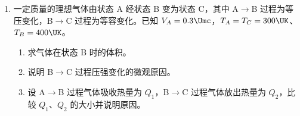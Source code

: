 \documentclass[\gkver]{gaokaozhenti}
\begin{document}
\begin{enumerate}
{（2）$\frac{t_{0}}{2}$ 时刻进入两极板的带电粒子，前 $\frac{t_{0}}{2}$ 时间在电场中偏转，后 $\frac{t_{0}}{2}$ 时间两极板没有电场，带电粒子做匀速直线运动。带电粒子沿 $x$ 轴方向的分速度大小为 $v_{0}=\frac{l}{t_{0}}$ ⑤，带电粒子离开电场时沿 $y$ 轴负方向的分速度大小为 $v_{y}=a\cdot\frac{1}{2}t_{0}$ ⑥，带电粒子离开电场时的速度大小为 $v=\sqrt{v_{x}^{2}+v_{y}^{2}}$ ⑦。设带电粒子离开电场进入磁场做匀速圆周运动的半径为 $R$，则有 $Bqv=m\frac{v^{2}}{R}$ ⑧，联立③⑤⑥⑦⑧式解得 $R=\frac{\sqrt{5}ml}{2qBt_{0}}$ ⑨。

（3）$2t_{0}$ 时刻进入两极板的带电粒子在磁场中运动时间最短。带电粒子离开电场时沿 $y$ 轴正方向的分速度为 $v_{y}'=at_{0}$ ⑩，设带电粒子离开电场时速度方向与 $y$ 轴正方向的夹角为 $\alpha$，则 $\tan\alpha=\frac{v_{0}}{v_{y}'}$，联立③⑤⑩式解得 $\alpha=\frac{\pi}{4}$，带电粒子在磁场运动的轨迹图如图所示，圆弧所对的圆心角为 $2\alpha=\frac{\pi}{2}$，所求最短时间为 $t_{\min}=\frac{1}{4}T$，带电粒子在磁场中运动的周期为 $T=\frac{2\pi m}{qB}$，联立以上两式解得 $t_{\min}=\frac{\pi m}{2qB}$。

}

\item
一定质量的理想气体由状态 A 经状态 B 变为状态 C，其中 A$\to$B 过程为等压变化，B$\to$C 过程为等容变化。已知 $V_{A}=0.3\Umc$，$T_{A}=T_{C}=300\UK$、$T_{B}=400\UK$。

\begin{enumerate}
	\item
	求气体在状态 B 时的体积。

	\item
	说明 B$\to$C 过程压强变化的微观原因。

	\item
	设 A$\to$B 过程气体吸收热量为 $Q_{1}$，B$\to$C 过程气体放出热量为 $Q_{2}$，比较 $Q_{1}$、$Q_{2}$ 的大小并说明原因。
\end{enumerate}

\end{enumerate}
\end{document}

